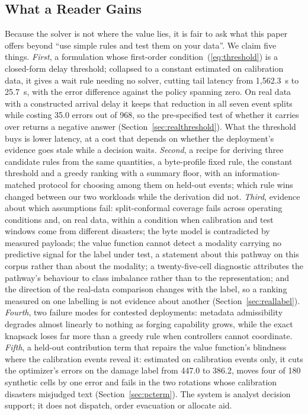 \documentclass[conference,a4paper]{IEEEtran}
\begin{document}
\subsection{What a Reader Gains}
Because the solver is not where the value lies, it is fair to ask what this paper offers beyond ``use
simple rules and test them on your data''. We claim five things. \emph{First}, a
formulation whose first-order condition~(\ref{eq:threshold}) is a closed-form delay
threshold; collapsed to a constant estimated on calibration data, it gives a wait rule
needing no solver, cutting tail latency from 1,562.3~s to 25.7~s, with the error difference
against the policy spanning zero. On real data with a constructed arrival delay it keeps that
reduction in all seven event splits while costing 35.0 errors out of 968, so the
pre-specified test of whether it carries over returns a negative answer
(Section~\ref{sec:realthreshold}). What the threshold buys is lower latency, at a cost that
depends on whether the deployment's evidence goes stale while a decision waits.
\emph{Second}, a recipe for deriving three candidate rules from the same quantities, a
byte-profile fixed rule, the constant threshold and a greedy ranking with a summary floor,
with an information-matched protocol for choosing among them on held-out events; which
rule wins changed between our two workloads while the derivation did not. \emph{Third},
evidence about which assumptions fail: split-conformal coverage fails across operating
conditions and, on real data, within a condition when calibration and test windows come
from different disasters; the byte model is contradicted by measured payloads; the value
function cannot detect a modality carrying no predictive signal for the label under test,
a statement about this pathway on this corpus rather than about the modality; a
twenty-five-cell diagnostic attributes the pathway's behaviour to class imbalance rather than to the
representation; and the direction of the real-data comparison changes with the label, so a
ranking measured on one labelling is not evidence about another
(Section~\ref{sec:reallabel}). \emph{Fourth}, two failure modes for contested deployments:
metadata admissibility degrades almost linearly to nothing as forging capability grows, while the
exact knapsack loses far more than a greedy rule when controllers cannot coordinate. \emph{Fifth}, a held-out contribution term that repairs the value function's blindness where the calibration events reveal it: estimated on calibration events only, it cuts the optimizer's errors on the damage label from 447.0 to 386.2, moves four of 180 synthetic cells by one error and fails in the two rotations whose calibration disasters misjudged text (Section~\ref{sec:pcterm}). The system is analyst decision support; it does not dispatch, order evacuation or allocate
aid.
\end{document}
